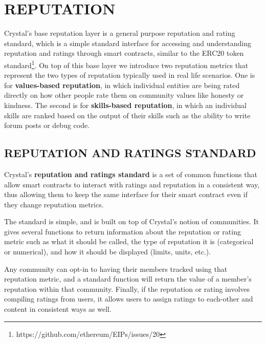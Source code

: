 \section{\texorpdfstring{\protect\hypertarget{_bwcjt25q5a7i}{}{\protect\hypertarget{_Toc462050407}{}{}}REPUTATION}{REPUTATION}}\label{reputation}

Crystal's base reputation layer is a general purpose reputation and
rating standard, which is a simple standard interface for accessing and
understanding reputation and ratings through smart contracts, similar to
the ERC20 token standard\footnote{https://github.com/ethereum/EIPs/issues/20}.
On top of this base layer we introduce two reputation metrics that
represent the two types of reputation typically used in real life
scenarios. One is for \textbf{values-based reputation}, in which
individual entities are being rated directly on how other people rate
them on community values like honesty or kindness. The second is for
\textbf{skills-based reputation}, in which an individual skills are
ranked based on the output of their skills such as the ability to write
forum posts or debug code.

\subsection{\texorpdfstring{\protect\hypertarget{_5mvgvpt00086}{}{\protect\hypertarget{_Toc462050408}{}{}}REPUTATION
AND RATINGS
STANDARD}{REPUTATION AND RATINGS STANDARD}}\label{reputation-and-ratings-standard}

Crystal's \textbf{reputation and ratings standard} is a set of common
functions that allow smart contracts to interact with ratings and
reputation in a consistent way, thus allowing them to keep the same
interface for their smart contract even if they change reputation
metrics.

The standard is simple, and is built on top of Crystal's notion of
communities. It gives several functions to return information about the
reputation or rating metric such as what it should be called, the type
of reputation it is (categorical or numerical), and how it should be
displayed (limits, units, etc.).

Any community can opt-in to having their members tracked using that
reputation metric, and a standard function will return the value of a
member's reputation within that community. Finally, if the reputation or
rating involves compiling ratings from users, it allows users to assign
ratings to each-other and content in consistent ways as well.


